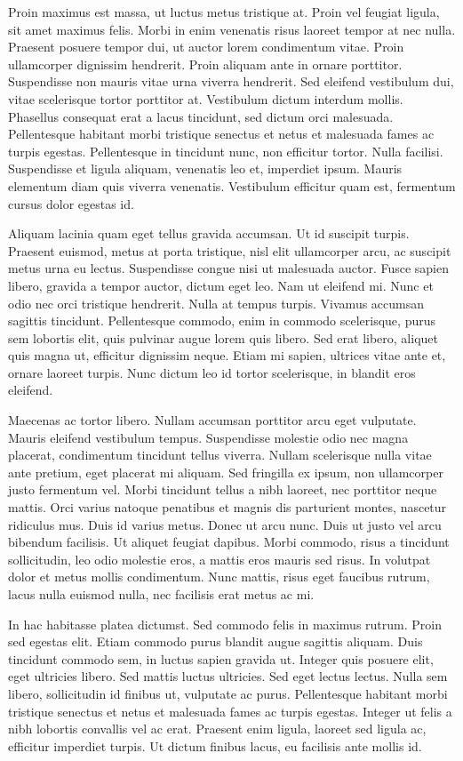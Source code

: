 \documentclass{article}
\begin{document}
Proin maximus est massa, ut luctus metus tristique at. Proin vel feugiat ligula, sit amet maximus felis. Morbi in enim venenatis risus laoreet tempor at nec nulla. Praesent posuere tempor dui, ut auctor lorem condimentum vitae. Proin ullamcorper dignissim hendrerit. Proin aliquam ante in ornare porttitor. Suspendisse non mauris vitae urna viverra hendrerit. Sed eleifend vestibulum dui, vitae scelerisque tortor porttitor at. Vestibulum dictum interdum mollis. Phasellus consequat erat a lacus tincidunt, sed dictum orci malesuada. Pellentesque habitant morbi tristique senectus et netus et malesuada fames ac turpis egestas. Pellentesque in tincidunt nunc, non efficitur tortor. Nulla facilisi. Suspendisse et ligula aliquam, venenatis leo et, imperdiet ipsum. Mauris elementum diam quis viverra venenatis. Vestibulum efficitur quam est, fermentum cursus dolor egestas id.

Aliquam lacinia quam eget tellus gravida accumsan. Ut id suscipit turpis. Praesent euismod, metus at porta tristique, nisl elit ullamcorper arcu, ac suscipit metus urna eu lectus. Suspendisse congue nisi ut malesuada auctor. Fusce sapien libero, gravida a tempor auctor, dictum eget leo. Nam ut eleifend mi. Nunc et odio nec orci tristique hendrerit. Nulla at tempus turpis. Vivamus accumsan sagittis tincidunt. Pellentesque commodo, enim in commodo scelerisque, purus sem lobortis elit, quis pulvinar augue lorem quis libero. Sed erat libero, aliquet quis magna ut, efficitur dignissim neque. Etiam mi sapien, ultrices vitae ante et, ornare laoreet turpis. Nunc dictum leo id tortor scelerisque, in blandit eros eleifend.

Maecenas ac tortor libero. Nullam accumsan porttitor arcu eget vulputate. Mauris eleifend vestibulum tempus. Suspendisse molestie odio nec magna placerat, condimentum tincidunt tellus viverra. Nullam scelerisque nulla vitae ante pretium, eget placerat mi aliquam. Sed fringilla ex ipsum, non ullamcorper justo fermentum vel. Morbi tincidunt tellus a nibh laoreet, nec porttitor neque mattis. Orci varius natoque penatibus et magnis dis parturient montes, nascetur ridiculus mus. Duis id varius metus. Donec ut arcu nunc. Duis ut justo vel arcu bibendum facilisis. Ut aliquet feugiat dapibus. Morbi commodo, risus a tincidunt sollicitudin, leo odio molestie eros, a mattis eros mauris sed risus. In volutpat dolor et metus mollis condimentum. Nunc mattis, risus eget faucibus rutrum, lacus nulla euismod nulla, nec facilisis erat metus ac mi.

In hac habitasse platea dictumst. Sed commodo felis in maximus rutrum. Proin sed egestas elit. Etiam commodo purus blandit augue sagittis aliquam. Duis tincidunt commodo sem, in luctus sapien gravida ut. Integer quis posuere elit, eget ultricies libero. Sed mattis luctus ultricies. Sed eget lectus lectus. Nulla sem libero, sollicitudin id finibus ut, vulputate ac purus. Pellentesque habitant morbi tristique senectus et netus et malesuada fames ac turpis egestas. Integer ut felis a nibh lobortis convallis vel ac erat. Praesent enim ligula, laoreet sed ligula ac, efficitur imperdiet turpis. Ut dictum finibus lacus, eu facilisis ante mollis id.
\end{document}
